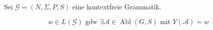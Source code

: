 {\begin{Bsp}
\end{Bsp}
\begin{lemma}
  Sei $\mathcal{G} = (N, \Sigma, P, S)$ eine kontextfreie Grammatik.

  \begin{displaymath}
    w \in L(\mathcal{G})  \text{ gdw } \exists \mathcal{A} \in \operatorname{Abl}(G, S) \text{ mit } Y(\mathcal{A}) = w
  \end{displaymath}
\end{lemma}

}

